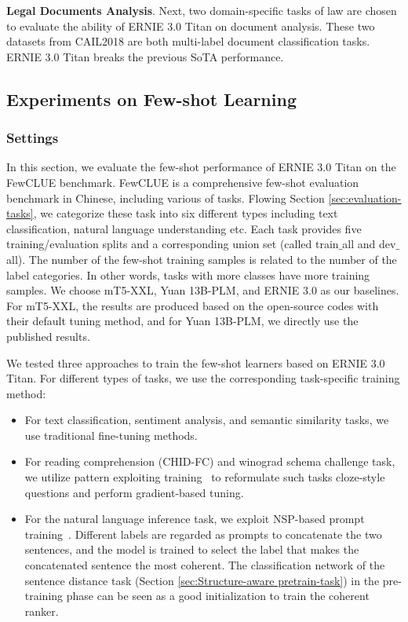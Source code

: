 \textbf{Legal Documents Analysis}. Next, two domain-specific tasks of law are chosen to evaluate the ability of ERNIE 3.0 Titan on document analysis. These two datasets from CAIL2018 are both multi-label document classification tasks. ERNIE 3.0 Titan breaks the previous SoTA performance.

\subsection{Experiments on Few-shot Learning}\label{sec:few-shot-tasks}
\subsubsection{Settings}
In this section, we evaluate the few-shot performance of ERNIE 3.0 Titan on the FewCLUE benchmark. FewCLUE is a comprehensive few-shot evaluation benchmark in Chinese, including various of tasks. Flowing Section \ref{sec:evaluation-tasks}, we categorize these task into six different types including text classification, natural language understanding etc. Each task provides five training/evaluation splits and a corresponding union set (called train$\_$all and dev$\_$all).  The number of the few-shot training samples is related to the number of the label categories. In other words, tasks with more classes have more training samples. We choose mT5-XXL, Yuan 13B-PLM, and ERNIE 3.0 as our baselines.  For mT5-XXL, the results are produced based on the open-source codes with their default tuning method, and for Yuan 13B-PLM, we directly use the published results.

We tested three approaches to train the few-shot learners based on ERNIE 3.0 Titan. For different types of tasks, we use the corresponding task-specific training method:

\begin{itemize}
\item For text classification, sentiment analysis, and semantic similarity tasks, we use traditional fine-tuning methods.
\item For reading comprehension (CHID-FC) and winograd schema challenge task, we utilize pattern exploiting training~\cite{schick2020exploiting} to reformulate such tasks cloze-style questions and perform gradient-based tuning.
\item For the natural language inference task, we exploit NSP-based prompt training~\cite{sun2021nsp}. Different labels are regarded as prompts to concatenate the two sentences, and the model is trained to select the label that makes the concatenated sentence the most coherent. The classification network of the sentence distance task (Section \ref{sec:Structure-aware pretrain-task}) in the pre-training phase can be seen as a good initialization to train the coherent ranker.
\end{itemize}

